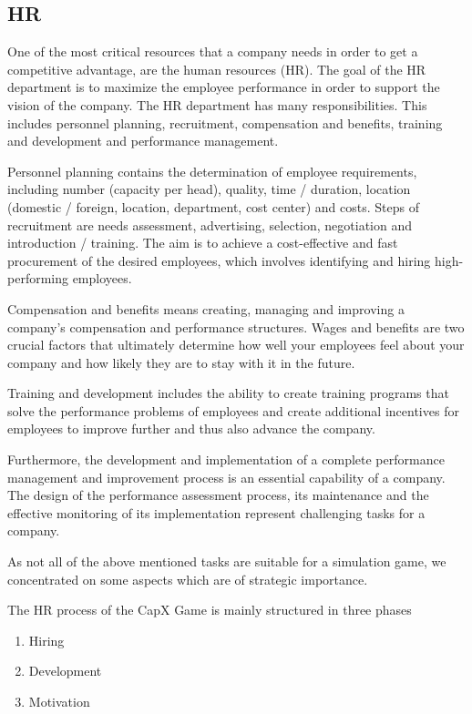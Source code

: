 \subsection{HR} 
\label{HR_manual}
One of the most critical resources that a company needs in order to get a competitive advantage, are the human resources (HR).
The goal of the HR department is to maximize the employee performance in order to support the vision of the company. The HR department has many responsibilities. This includes personnel planning, recruitment, compensation and benefits, training and development and performance management.

Personnel planning contains the determination of employee requirements, including number (capacity per head), quality, time / duration, location (domestic / foreign, location, department, cost center) and costs. Steps of recruitment are needs assessment, advertising, selection, negotiation and introduction / training. The aim is to achieve a cost-effective and fast procurement of the desired employees, which involves identifying and hiring high-performing employees. 

Compensation and benefits means creating, managing and improving a company's compensation and performance structures. Wages and benefits are two crucial factors that ultimately determine how well your employees feel about your company and how likely they are to stay with it in the future.

Training and development includes the ability to create training programs that solve the performance problems of employees and create additional incentives for employees to improve further and thus also advance the company.

Furthermore, the development and implementation of a complete performance management and improvement process is an essential capability of a company. The design of the performance assessment process, its maintenance and the effective monitoring of its implementation represent challenging tasks for a company. 

As not all of the above mentioned tasks are suitable for a simulation game, we concentrated on some aspects which are of strategic importance.

The HR process of the CapX Game is mainly structured in three phases
\begin{enumerate}
    \item Hiring
    \item Development
    \item Motivation
\end{enumerate}

